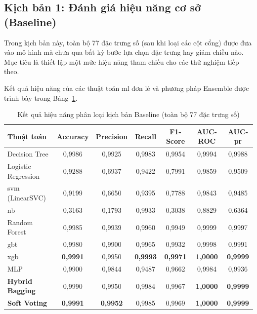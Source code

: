 \subsection{Kịch bản 1: Đánh giá hiệu năng cơ sở (Baseline)}
Trong kịch bản này, toàn bộ 77 đặc trưng số (sau khi loại các cột cổng) được đưa vào mô hình mà chưa qua bất kỳ bước lựa chọn đặc trưng hay giảm chiều nào. Mục tiêu là thiết lập một mức hiệu năng tham chiếu cho các thử nghiệm tiếp theo.

Kết quả hiệu năng của các thuật toán \ac{ml} đơn lẻ và phương pháp Ensemble được trình bày trong Bảng~\ref{tab:exp0_ml_metrics}.
\begin{table}[htbp]
\centering
\caption[Hiệu năng phân loại kịch bản Baseline]{Kết quả hiệu năng phân loại kịch bản Baseline (toàn bộ 77 đặc trưng số)}
\label{tab:exp0_ml_metrics}
\small
\begin{tabular*}{\textwidth}{@{\extracolsep{\fill}}lcccccc@{}}
\toprule
\textbf{Thuật toán} & \textbf{Accuracy} & \textbf{Precision} & \textbf{Recall} & \textbf{F1-Score} & \textbf{AUC-ROC} & \textbf{AUC-\ac{pr}} \\ 
\midrule
Decision Tree          & 0{,}9986 & 0{,}9925 & 0{,}9983 & 0{,}9954 & 0{,}9994 & 0{,}9988 \\
Logistic Regression    & 0{,}9288 & 0{,}6937 & 0{,}9422 & 0{,}7991 & 0{,}9859 & 0{,}9509 \\
\ac{svm} (LinearSVC)        & 0{,}9199 & 0{,}6650 & 0{,}9395 & 0{,}7788 & 0{,}9843 & 0{,}9485 \\
\ac{nb}            & 0{,}3163 & 0{,}1793 & 0{,}9933 & 0{,}3038 & 0{,}8829 & 0{,}6364 \\
Random Forest          & 0{,}9985 & 0{,}9939 & 0{,}9960 & 0{,}9949 & 0{,}9999 & 0{,}9997 \\
\ac{gbt}                    & 0{,}9980 & 0{,}9900 & 0{,}9965 & 0{,}9932 & 0{,}9998 & 0{,}9991 \\
\ac{xgb}                & \textbf{0{,}9991} & 0{,}9950 & \textbf{0{,}9993} & \textbf{0{,}9971} & \textbf{1{,}0000} & \textbf{0{,}9999} \\
MLP                    & 0{,}9900 & 0{,}9844 & 0{,}9487 & 0{,}9662 & 0{,}9984 & 0{,}9936 \\
\midrule
\textbf{Hybrid Bagging}   & 0{,}9990 & 0{,}9950 & 0{,}9984 & 0{,}9967 & \textbf{1{,}0000} & \textbf{0{,}9999} \\
\textbf{Soft Voting}  & \textbf{0{,}9991} & \textbf{0{,}9952} & 0{,}9985 & 0{,}9969 & \textbf{1{,}0000} & \textbf{0{,}9999} \\
\bottomrule
\end{tabular*}
\end{table}

